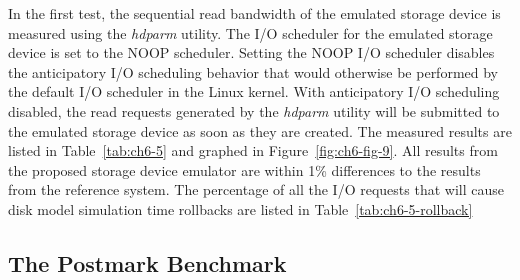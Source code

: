In the first test, the sequential read bandwidth of the emulated storage device is measured using the \textit{hdparm} utility. The I/O scheduler for the emulated storage device is set to the NOOP scheduler. Setting the NOOP I/O scheduler disables the anticipatory I/O scheduling behavior that would otherwise be performed by the default I/O scheduler in the Linux kernel. With anticipatory I/O scheduling disabled, the read requests generated by the \textit{hdparm} utility will be submitted to the emulated storage device as soon as they are created. The measured results are listed in Table~\ref{tab:ch6-5} and graphed in Figure~\ref{fig:ch6-fig-9}. All results from the proposed storage device emulator are within 1\% differences to the results from the reference system. The percentage of all the I/O requests that will cause disk model simulation time rollbacks are listed in Table~\ref{tab:ch6-5-rollback}  


\subsection{The Postmark Benchmark}
\label{sec:ch6-6.6.2}

